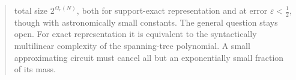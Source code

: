 \documentclass[11pt]{article}
\theoremstyle{definition}
\theoremstyle{remark}
\theoremstyle{plain}
\newcommand{\eps}{\varepsilon}
\begin{document}
\begin{abstract}
total size $2^{\Omega_r(N)}$, both for support-exact representation and at error $\eps<\frac12$, though with astronomically small constants. The general question stays open. For exact representation it is equivalent to the syntactically multilinear complexity of the spanning-tree polynomial. A small approximating circuit must cancel all but an exponentially small fraction of its mass.
\end{abstract}

\tableofcontents















\appendix




\end{document}
